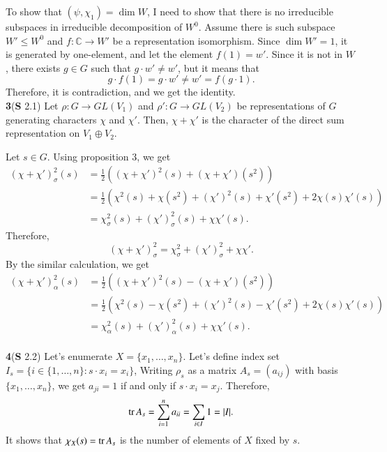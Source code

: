 \documentclass[a4paper, 12pt]{article}
\theoremstyle{Mydefinition}
\theoremstyle{Mytheorem}
\begin{document}
To show that $(\psi, \chi_1)=\dim W$, I need to show that there is no irreducible subspaces in irreducible decomposition of $W^0$. Assume there is such subspace $W'\leq W^0$ and $f:\mathbb{C}\rightarrow W'$ be a representation isomorphism. Since $\dim W' = 1$, it is generated by one-element, and let the element $f(1) = w'$. Since it is not in $W$, there exists $g\in G$ such that $g\cdot w'\neq w'$, but it means that
\begin{equation}
    g\cdot f(1) = g\cdot w'\neq  w' = f(g\cdot 1).
\end{equation}
Therefore, it is contradiction, and we get the identity.\\

\noindent \textbf{3}(\textbf{S} 2.1) 
Let $\rho:G\rightarrow GL(V_1)$ and $\rho':G\rightarrow GL(V_2)$ be representations of $G$ generating characters $\chi$ and $\chi'$. Then, $\chi+\chi'$ is the character of the direct sum representation on $V_1\oplus V_2$.

Let $s\in G$. Using proposition $3$, we get
\begin{equation}
    \begin{split}
        (\chi+\chi')_\sigma^2(s) &= \frac{1}{2}\left((\chi+\chi')^2(s)+(\chi+\chi')(s^2)\right)\\
        &=\frac{1}{2}\left(\chi^2(s)+\chi(s^2) + (\chi')^2(s) + \chi'(s^2) + 2\chi(s)\chi'(s)\right)\\
        &=\chi_\sigma^2(s)+(\chi')_\sigma^2(s) + \chi\chi'(s).
    \end{split}
\end{equation}
Therefore,
\begin{equation}
    (\chi+\chi')_\sigma^2 =\chi_\sigma^2+\left(\chi'\right)_\sigma^2 + \chi\chi'.
\end{equation}
By the similar calculation, we get
\begin{equation}
    \begin{split}
        (\chi+\chi')_\alpha^2(s) &= \frac{1}{2}\left((\chi+\chi')^2(s)-(\chi+\chi')(s^2)\right)\\
        &=\frac{1}{2}\left(\chi^2(s)-\chi(s^2) + (\chi')^2(s) - \chi'(s^2) + 2\chi(s)\chi'(s)\right)\\
        &=\chi_\alpha^2(s)+\left(\chi'\right)_\alpha^2(s) + \chi\chi'(s).
    \end{split}
\end{equation}\\

\noindent \textbf{4}(\textbf{S} 2.2)
Let's enumerate $X=\{x_1, \ldots, x_n\}$. Let's define index set $I_s = \{i\in \{1, \ldots, n\}:s\cdot x_i = x_i\}$, Writing $\rho_s$ as a matrix $A_s = (a_{ij})$ with basis $\{x_1, \ldots, x_n\}$, we get $a_{ji} = 1$ if and only if $s\cdot x_i = x_j$. Therefore,
\begin{equation}
    \tr A_s = \sum_{i=1}^n a_{ii} = \sum_{i\in I} 1 = \abs{I}. 
\end{equation}
It shows that $\chi_{X}(s) = \tr A_s$ is the number of elements of $X$ fixed by $s$.\\
\end{document}
